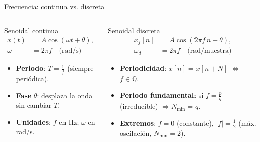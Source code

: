\documentclass[
    10pt,
    aspectratio=169,
    xcolor={dvipsnames},
    spanish,
    ]{beamer}
\begin{document}
\begin{frame}{Frecuencia: continua vs. discreta}
\begin{columns}[T,onlytextwidth]

\begin{column}{0.48\textwidth}
\begin{block}{Senoidal continua}
\small
\[
\begin{aligned}
x(t)&=A\cos(\omega t+\theta),\\
\omega&=2\pi f \quad \text{(rad/s)}
\end{aligned}
\]
\vspace{0.2em}
\begin{itemize}
  \item \textbf{Periodo}: \(T=\tfrac{1}{f}\) (siempre periódica).
  \item \textbf{Fase} \(\theta\): desplaza la onda sin cambiar \(T\).
  \item \textbf{Unidades}: \(f\) en Hz; \(\omega\) en rad/s.
\end{itemize}
\end{block}
\end{column}

\begin{column}{0.48\textwidth}
\begin{block}{Senoidal discreta}
\small
\[
\begin{aligned}
x_f[n]&=A\cos(2\pi f\,n+\theta),\\
\omega_d&=2\pi f \quad \text{(rad/muestra)}
\end{aligned}
\]
\vspace{0.2em}
\begin{itemize}
  \item \textbf{Periodicidad}: \(x[n]=x[n+N]\) \(\Leftrightarrow\) \(f\in\mathbb{Q}\).
  \item \textbf{Periodo fundamental}: si \(f=\tfrac{p}{q}\) (irreducible) \(\Rightarrow N_{\min}=q\).
  \item \textbf{Extremos}: \(f=0\) (constante), \(|f|=\tfrac12\) (máx. oscilación, \(N_{\min}=2\)).
\end{itemize}
\end{block}
\end{column}

\end{columns}
\end{frame}
\end{document}
